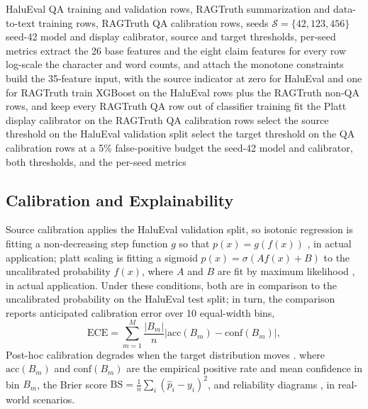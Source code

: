 \documentclass[a4paper,fleqn]{cas-sc}
\begin{document}
\begin{algorithm}[H]
  \caption{Evidence-consistent XGBoost (EC-XGB) training and deployment}
  \label{alg:ecxgb}
  \begin{algorithmic}[1]
    \Require HaluEval QA training and validation rows, RAGTruth summarization and data-to-text training rows, RAGTruth QA calibration rows, seeds $\mathcal{S}=\{42,123,456\}$
    \Ensure seed-42 model and display calibrator, source and target thresholds, per-seed metrics
    \State extract the 26 base features and the eight claim features for every row
    \State log-scale the character and word counts, and attach the monotone constraints
    \State build the 35-feature input, with the source indicator at zero for HaluEval and one for RAGTruth
    \State train XGBoost on the HaluEval rows plus the RAGTruth non-QA rows, and keep every RAGTruth QA row out of classifier training
    \State fit the Platt display calibrator on the RAGTruth QA calibration rows
    \State select the source threshold on the HaluEval validation split
    \State select the target threshold on the QA calibration rows at a 5\% false-positive budget
    \EndFor
    \State \Return the seed-42 model and calibrator, both thresholds, and the per-seed metrics
  \end{algorithmic}
\end{algorithm}



\subsection{Calibration and Explainability}

Source calibration applies the HaluEval validation split, so isotonic regression is fitting a non-decreasing step function $g$ so that $p(x) = g(f(x))$ \cite{isotonic}, in actual application; platt scaling is fitting a sigmoid $p(x) = \sigma(A f(x) + B)$ to the uncalibrated probability $f(x)$, where $A$ and $B$ are fit by maximum likelihood \cite{platt}, in actual application. Under these conditions, both are in comparison to the uncalibrated probability on the HaluEval test split; in turn, the comparison reports anticipated calibration error over 10 equal-width bins,
\begin{equation}
  \mathrm{ECE} = \sum_{m=1}^{M} \frac{|B_m|}{n} \left| \mathrm{acc}(B_m) - \mathrm{conf}(B_m) \right|,
\end{equation}
Post-hoc calibration degrades when the target distribution moves \cite{gasparin2024distance}. where $\mathrm{acc}(B_m)$ and $\mathrm{conf}(B_m)$ are the empirical positive rate and mean confidence in bin $B_m$, the Brier score $\mathrm{BS} = \frac{1}{n}\sum_i (\hat{p}_i - y_i)^2$, and reliability diagrams \cite{guo}, in real-world scenarios.
\end{document}
